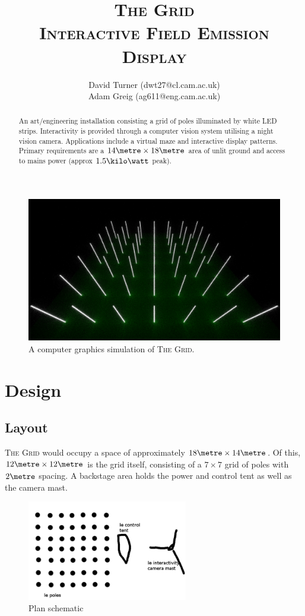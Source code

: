 \documentclass[12pt]{article} %
\title{\textsc{The Grid}\\\large{\textsc{Interactive Field Emission Display}}}
\author{David Turner (dwt27@cl.cam.ac.uk)\\Adam Greig (ag611@eng.cam.ac.uk)}
\date{} %
\begin{document}
    \maketitle

\renewcommand{\abstractname}{Summary}
\begin{abstract}
An art/engineering installation consisting a grid of poles illuminated by white LED strips.  Interactivity is provided through a computer vision system utilising a night vision camera.  Applications include a virtual maze and interactive display patterns.  Primary requirements are a $14\metre \times 18\metre$ area of unlit ground and access to mains power (approx $1.5\kilo\watt$ peak).
\end{abstract}

\begin{figure}[h]
    \centering
    \includegraphics[width=\textwidth]{pics/render1.png}
    \caption{A computer graphics simulation of \textsc{The Grid}.}
\end{figure}

\clearpage
\section{Design}
\subsection{Layout}
\textsc{The Grid} would occupy a space of approximately $18\metre \times 14\metre$.  Of this, $12\metre \times 12\metre$ is the grid itself, consisting of a $7 \times 7$ grid of poles with $2\metre$ spacing.  A backstage area holds the power and control tent as well as the camera mast.

\begin{figure}[h]
    \centering
    \includegraphics[width=7cm]{diags/plan.png}
    \caption{Plan schematic}
    \label{fig:planschematic}
\end{figure}
\end{document}

